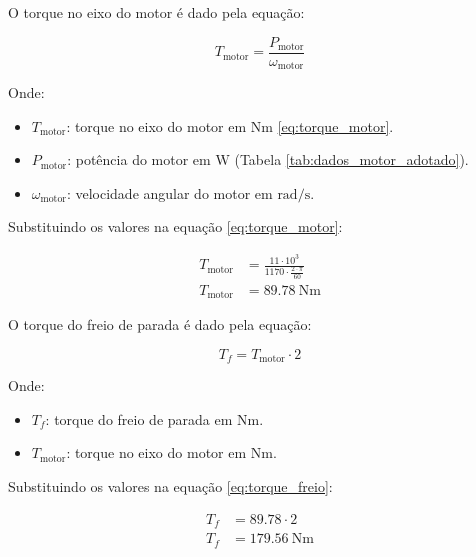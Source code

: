 ﻿O torque no eixo do motor é dado pela equação:

\begin{equation}
  T_{\text{motor}} = \frac{P_{\text{motor}}}{\omega_{\text{motor}}}
  \label{eq:torque_motor}
\end{equation}

Onde:

\begin{itemize}[leftmargin=1.25cm]
  \item $T_{\text{motor}}$: torque no eixo do motor em $\si{\newton\meter}$ \eqref{eq:torque_motor}.
  \item $P_{\text{motor}}$: potência do motor em $\si{\watt}$ (Tabela \ref{tab:dados_motor_adotado}).
  \item $\omega_{\text{motor}}$: velocidade angular do motor em $\si{\radian\per\second}$.
\end{itemize}

\vspace{1em}

Substituindo os valores na equação \eqref{eq:torque_motor}:

\begin{align*}
  T_{\text{motor}} & = \frac{11 \cdot 10^3}{1170 \cdot \frac{2 \cdot \pi}{60}} \\
  T_{\text{motor}} & = \boxed{\SI{89.78}{\newton\meter}}
\end{align*}

O torque do freio de parada é dado pela equação:

\begin{equation}
  T_f = T_{\text{motor}} \cdot 2
  \label{eq:torque_freio}
\end{equation}

Onde:

\begin{itemize}[leftmargin=1.25cm]
  \item $T_f$: torque do freio de parada em $\si{\newton\meter}$.
  \item $T_{\text{motor}}$: torque no eixo do motor em $\si{\newton\meter}$.
\end{itemize}

\vspace{1em}

Substituindo os valores na equação \eqref{eq:torque_freio}:

\begin{align*}
  T_f & = \num{89.78} \cdot 2                \\
  T_f & = \boxed{\SI{179.56}{\newton\meter}}
\end{align*}

